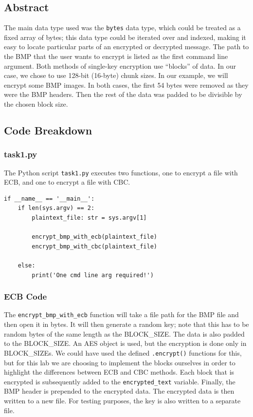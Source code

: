 \documentclass[11pt]{article}
\begin{document}
\subsection*{Abstract}
The main data type used was the \verb|bytes| data type, which could be treated as a fixed array of bytes; this data type could be iterated over and indexed, making it easy to locate particular parts of an encrypted or decrypted message. The path to the BMP that the user wants to encrypt is listed as the first command line argument. Both methods of single-key encryption use ``blocks'' of data. In our case, we chose to use 128-bit (16-byte) chunk sizes. In our example, we will encrypt some BMP images. In both cases, the first 54 bytes were removed as they were the BMP headers. Then the rest of the data was padded to be divisible by the chosen block size.

\subsection*{Code Breakdown}
\subsubsection*{task1.py}

The Python script \verb|task1.py| executes two functions, one to encrypt a file with ECB, and one to encrypt a file with CBC. 

\begin{framed}
\begin{verbatim}
if __name__ == '__main__':
    if len(sys.argv) == 2:
        plaintext_file: str = sys.argv[1]

        encrypt_bmp_with_ecb(plaintext_file)
        encrypt_bmp_with_cbc(plaintext_file)

    else:
        print('One cmd line arg required!')
\end{verbatim}
\end{framed}

\subsubsection*{ECB Code}

The \verb|encrypt_bmp_with_ecb| function will take a file path for the BMP file and then open it in bytes. It will then generate a random key; note that this has to be random bytes of the same length as the BLOCK\_SIZE. The data is also padded to the BLOCK\_SIZE. An AES object is used, but the encryption is done only in BLOCK\_SIZEs. We could have used the defined \verb|.encrypt()| functions for this, but for this lab we are choosing to implement the blocks ourselves in order to highlight the differences between ECB and CBC methods. Each block that is encrypted is subsequently added to the \verb|encrypted_text| variable. Finally, the BMP header is prepended to the encrypted data. The encrypted data is then written to a new file. For testing purposes, the key is also written to a separate file. 
\end{document}
